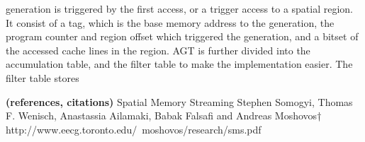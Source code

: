 generation
is triggered by the first access, or a trigger access to a spatial
region.  It consist of a tag, which is the base memory address to the
generation, the program counter and region offset which triggered the
generation, and a bitset of the accessed cache lines in the region.
AGT is further divided into the accumulation table, and the filter
table to make the implementation easier. The filter table stores

{\bf (references, citations)}
Spatial Memory Streaming
Stephen Somogyi, Thomas F. Wenisch,
Anastassia Ailamaki, Babak Falsafi and Andreas Moshovos†
http://www.eecg.toronto.edu/~moshovos/research/sms.pdf
